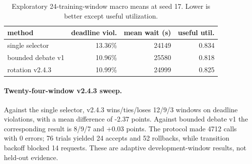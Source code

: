 \begin{table}[t]
\caption{Exploratory 24-training-window macro means at seed 17. Lower is better except useful utilization.}
\label{tab:v243-sweep}
\centering
\scriptsize
\begin{tabular}{lrrr}
\toprule
method & deadline viol. & mean wait (s) & useful util. \\
\midrule
single selector & 13.36\% & 24149 & 0.834 \\
bounded debate v1 & 10.96\% & 25580 & 0.818 \\
rotation v2.4.3 & 10.99\% & 24999 & 0.825 \\
\bottomrule
\end{tabular}
\end{table}

\paragraph{Twenty-four-window v2.4.3 sweep.}
Against the single selector, v2.4.3 wins/ties/loses
12/9/3 windows on deadline violations,
with a mean difference of -2.37 points. Against bounded
debate v1 the corresponding result is
8/9/7 and
+0.03 points. The protocol made
4712 calls with 0 errors; 76
trials yielded 24 accepts and
52 rollbacks, while transition backoff blocked
14 requests. These are adaptive development-window
results, not held-out evidence.
